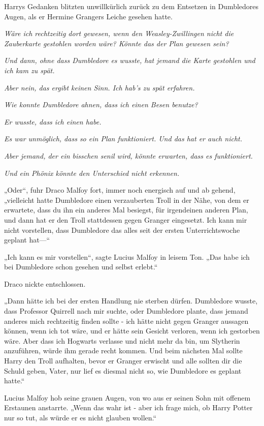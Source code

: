 {Harrys Gedanken blitzten unwillkürlich zurück zu dem Entsetzen in Dumbledores Augen, als er Hermine Grangers Leiche gesehen hatte.

\emph{Wäre ich rechtzeitig dort gewesen, wenn den Weasley-Zwillingen nicht die Zauberkarte gestohlen worden wäre? Könnte das der Plan gewesen sein?}

\emph{Und dann, ohne dass Dumbledore es wusste, hat jemand die Karte gestohlen und ich kam zu spät.}

\emph{Aber nein, das ergibt keinen Sinn. Ich hab's zu spät erfahren.}

\emph{Wie konnte Dumbledore ahnen, dass ich einen Besen benutze?}

\emph{Er wusste, dass ich einen habe.}

\emph{Es war unmöglich, dass so ein Plan funktioniert. Und das hat er auch nicht.}

\emph{Aber jemand, der ein bisschen senil wird, könnte erwarten, dass es funktioniert.}

\emph{Und ein Phönix könnte den Unterschied nicht erkennen.}

„Oder“, fuhr Draco Malfoy fort, immer noch energisch auf und ab gehend, „vielleicht hatte Dumbledore einen verzauberten Troll in der Nähe, von dem er erwartete, dass du ihn ein anderes Mal besiegst, für irgendeinen anderen Plan, und dann hat er den Troll stattdessen gegen Granger eingesetzt. Ich kann mir nicht vorstellen, dass Dumbledore das alles seit der ersten Unterrichtswoche geplant hat—“

„Ich kann es mir vorstellen“, sagte Lucius Malfoy in leisem Ton. „Das habe ich bei Dumbledore schon gesehen und selbst erlebt.“

Draco nickte entschlossen.

„Dann hätte ich bei der ersten Handlung nie sterben dürfen. Dumbledore wusste, dass Professor Quirrell nach mir suchte, oder Dumbledore plante, dass jemand anderes mich rechtzeitig finden sollte - ich hätte nicht gegen Granger aussagen können, wenn ich tot wäre, und er hätte sein Gesicht verloren, wenn ich gestorben wäre. Aber dass ich Hogwarts verlasse und nicht mehr da bin, um Slytherin anzuführen, würde ihm gerade recht kommen. Und beim nächsten Mal sollte Harry den Troll aufhalten, bevor er Granger erwischt und alle sollten dir die Schuld geben, Vater, nur lief es diesmal nicht so, wie Dumbledore es geplant hatte.“

Lucius Malfoy hob seine grauen Augen, von wo aus er seinen Sohn mit offenem Erstaunen anstarrte. „Wenn das wahr ist - aber ich frage mich, ob Harry Potter nur so tut, als würde er es nicht glauben wollen.“

}
